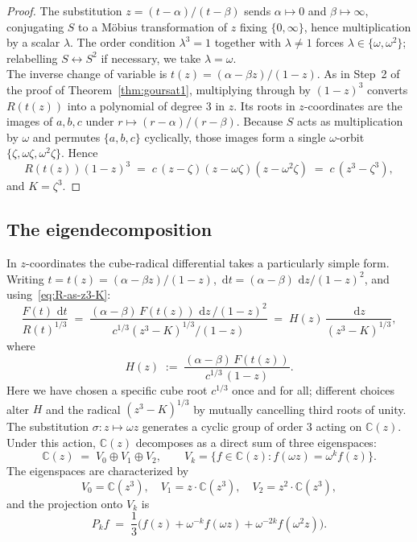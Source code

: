 \documentclass[11pt,a4paper]{article}
\theoremstyle{plain}
\theoremstyle{definition}
\theoremstyle{remark}
\newcommand{\C}{\mathbb{C}}
\renewcommand{\d}{\,\mathrm{d}}
\begin{document}
\begin{proof}
The substitution $z=(t-\alpha)/(t-\beta)$ sends $\alpha\mapsto 0$ and $\beta\mapsto\infty$, conjugating $S$ to a M\"obius transformation of $z$ fixing $\{0,\infty\}$, hence multiplication by a scalar $\lambda$. The order condition $\lambda^3=1$ together with $\lambda\neq 1$ forces $\lambda\in\{\omega,\omega^2\}$; relabelling $S\leftrightarrow S^2$ if necessary, we take $\lambda=\omega$.\\

The inverse change of variable is $t(z)=(\alpha-\beta z)/(1-z)$. As in Step~2 of the proof of Theorem~\ref{thm:goursat1}, multiplying through by $(1-z)^3$ converts $R(t(z))$ into a polynomial of degree $3$ in $z$. Its roots in $z$-coordinates are the images of $a,b,c$ under $r\mapsto(r-\alpha)/(r-\beta)$. Because $S$ acts as multiplication by $\omega$ and permutes $\{a,b,c\}$ cyclically, those images form a single $\omega$-orbit $\{\zeta,\omega\zeta,\omega^2\zeta\}$. Hence
\[
  R(t(z))(1-z)^3 \;=\; c\,(z-\zeta)(z-\omega\zeta)(z-\omega^2\zeta) \;=\; c\,(z^3 - \zeta^3),
\]
and $K=\zeta^3$.
\end{proof}

\subsection{The eigendecomposition}

In $z$-coordinates the cube-radical differential takes a particularly simple form. Writing $t=t(z)=(\alpha-\beta z)/(1-z)$, $\d t=(\alpha-\beta)\,\d z/(1-z)^2$, and using~\eqref{eq:R-as-z3-K}:
\begin{equation}\label{eq:H-defn}
  \frac{F(t)\,\d t}{R(t)^{1/3}} \;=\; \frac{(\alpha-\beta)\,F(t(z))\,\d z\,/(1-z)^2}{c^{1/3}(z^3-K)^{1/3}/(1-z)} \;=\; H(z)\,\frac{\d z}{(z^3-K)^{1/3}},
\end{equation}
where
\begin{equation}\label{eq:H-formula}
  H(z) \;:=\; \frac{(\alpha-\beta)\,F(t(z))}{c^{1/3}\,(1-z)}.
\end{equation}
Here we have chosen a specific cube root $c^{1/3}$ once and for all; different choices alter $H$ and the radical $(z^3-K)^{1/3}$ by mutually cancelling third roots of unity.\\

The substitution $\sigma\colon z\mapsto \omega z$ generates a cyclic group of order $3$ acting on $\C(z)$. Under this action, $\C(z)$ decomposes as a direct sum of three eigenspaces:
\[
  \C(z) \;=\; V_0 \oplus V_1 \oplus V_2,\qquad V_k = \{f \in \C(z) : f(\omega z) = \omega^k f(z)\}.
\]
The eigenspaces are characterized by
\[
  V_0 = \C(z^3),\quad V_1 = z\cdot\C(z^3),\quad V_2 = z^2\cdot\C(z^3),
\]
and the projection onto $V_k$ is
\begin{equation}\label{eq:projection-Vk}
  P_k f \;=\; \frac{1}{3}\bigl(f(z) + \omega^{-k}f(\omega z) + \omega^{-2k}f(\omega^2 z)\bigr).
\end{equation}
\end{document}
